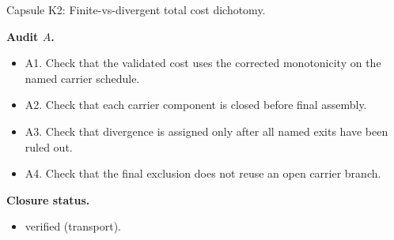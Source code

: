 \documentclass[11pt]{amsart}
\newcommand{\capsulefield}[1]{\par\smallskip\noindent\textbf{#1.}\ }
\begin{document}
\begin{proofcapsule}{Capsule K2: Finite-vs-divergent total cost dichotomy.}
  \capsulefield{Audit \(A\)}
  \begin{itemize}[leftmargin=1.8em]
  \item A1. Check that the validated cost uses the corrected monotonicity on the named carrier schedule.
  \item A2. Check that each carrier component is closed before final assembly.
  \item A3. Check that divergence is assigned only after all named exits have been ruled out.
  \item A4. Check that the final exclusion does not reuse an open carrier branch.
  \end{itemize}
  \capsulefield{Closure status}
  \begin{itemize}[leftmargin=1.8em]
  \item verified (transport).
  \end{itemize}
\end{proofcapsule}
\end{document}
